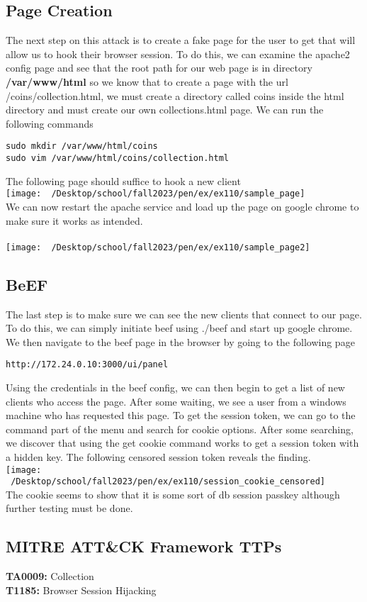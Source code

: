 \documentclass[notitlepage]{article}
\begin{document}
    \subsection{Page Creation}
    The next step on this attack is to create a fake page for the user to get that will allow us to hook
    their browser session. To do this, we can examine the apache2 config page and see that the root path 
    for our web page is in directory \textbf{/var/www/html} so we know that to create a page with 
    the url /coins/collection.html, we must create a directory called coins inside the html directory
    and must create our own collections.html page. We can run the following commands 
\begin{verbatim}
sudo mkdir /var/www/html/coins
sudo vim /var/www/html/coins/collection.html
\end{verbatim}
    The following page should suffice to hook a new client \\
\texttt{[image: ~/Desktop/school/fall2023/pen/ex/ex110/sample\_page]}\\
    We can now restart the apache service and load up the page on google chrome to make sure it works
    as intended. \\~\\
\texttt{[image: ~/Desktop/school/fall2023/pen/ex/ex110/sample\_page2]}\\


    \subsection{BeEF}
    The last step is to make sure we can see the new clients that connect to our page. To do this, we
    can simply initiate beef using ./beef and start up google chrome. We then navigate to the beef page
    in the browser by going to the following page
    \begin{verbatim}
http://172.24.0.10:3000/ui/panel 
   \end{verbatim}
   Using the credentials in the beef config, we can then begin to get a list of new clients who access
   the page. After some waiting, we see a user from a windows machine who has requested this page. To
   get the session token, we can go to the command part of the menu and search for cookie options. After
   some searching, we discover that using the get cookie command works to get a session token with a hidden
   key. The following censored session token reveals the finding. \\
\texttt{[image: ~/Desktop/school/fall2023/pen/ex/ex110/session\_cookie\_censored]}\\
    The cookie seems to show that it is some sort of db session passkey although further testing must
    be done.

    \subsection{MITRE ATT{\&}CK Framework TTPs}


    \indent\textbf{TA0009:} Collection \\
    \indent\indent\textbf{T1185:} Browser Session Hijacking \\
\end{document}
